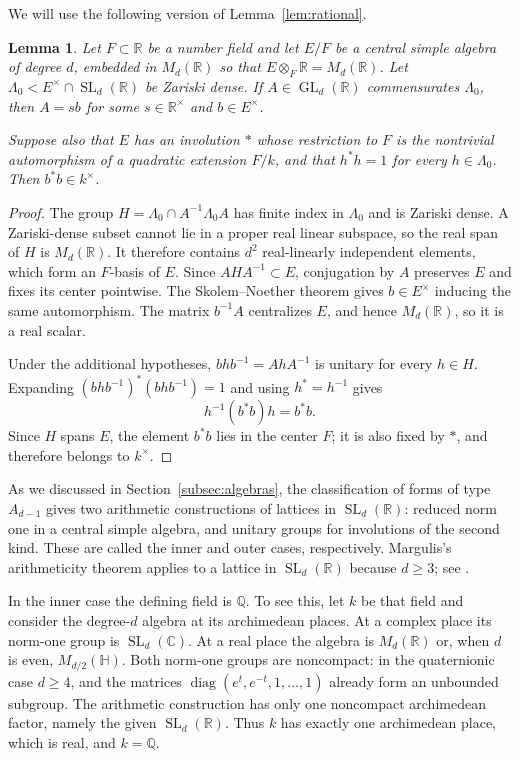 \documentclass[reqno]{amsart}
\newtheorem{lemma}[theorem]{Lemma}
\theoremstyle{remark}
\DeclareMathOperator{\GL}{GL}
\DeclareMathOperator{\SL}{SL}
\newcommand{\R}{\mathbb R}
\newcommand{\C}{\mathbb C}
\newcommand{\Q}{\mathbb Q}
\begin{document}
We will use the following version of Lemma~\ref{lem:rational}.

\begin{lemma}\label{lem:csarational}
Let $F\subset\R$ be a number field and let $E/F$ be a central simple algebra of degree $d$, embedded in $M_d(\R)$ so that $E\otimes_F\R=M_d(\R)$. Let $\Lambda_0<E^\times\cap\SL_d(\R)$ be Zariski dense. If $A\in\GL_d(\R)$ commensurates $\Lambda_0$, then $A=sb$ for some $s\in\R^\times$ and $b\in E^\times$.

Suppose also that $E$ has an involution $*$ whose restriction to $F$ is the nontrivial automorphism of a quadratic extension $F/k$, and that $h^*h=1$ for every $h\in\Lambda_0$. Then $b^*b\in k^\times$.
\end{lemma}

\begin{proof}
The group $H=\Lambda_0\cap A^{-1}\Lambda_0A$ has finite index in $\Lambda_0$ and is Zariski dense. A Zariski-dense subset cannot lie in a proper real linear subspace, so the real span of $H$ is $M_d(\R)$. It therefore contains $d^2$ real-linearly independent elements, which form an $F$-basis of $E$. Since $AHA^{-1}\subset E$, conjugation by $A$ preserves $E$ and fixes its center pointwise. The Skolem--Noether theorem gives $b\in E^\times$ inducing the same automorphism. The matrix $b^{-1}A$ centralizes $E$, and hence $M_d(\R)$, so it is a real scalar.

Under the additional hypotheses, $bhb^{-1}=AhA^{-1}$ is unitary for every $h\in H$. Expanding $(bhb^{-1})^*(bhb^{-1})=1$ and using $h^*=h^{-1}$ gives
$$
h^{-1}(b^*b)h=b^*b.
$$
Since $H$ spans $E$, the element $b^*b$ lies in the center $F$; it is also fixed by $*$, and therefore belongs to $k^\times$.
\end{proof}

As we discussed in Section~\ref{subsec:algebras}, the classification of forms of type $A_{d-1}$ gives two arithmetic constructions of lattices in $\SL_d(\R)$: reduced norm one in a central simple algebra, and unitary groups for involutions of the second kind. These are called the inner and outer cases, respectively. Margulis's arithmeticity theorem applies to a lattice in $\SL_d(\R)$ because $d \ge 3$; see \cite[Theorem 5.2.1]{MorrisAG}.

In the inner case the defining field is $\Q$. To see this, let $k$ be that field and consider the degree-$d$ algebra at its archimedean places. At a complex place its norm-one group is $\SL_d(\C)$. At a real place the algebra is $M_d(\R)$ or, when $d$ is even, $M_{d/2}(\mathbb H)$. Both norm-one groups are noncompact: in the quaternionic case $d\ge4$, and the matrices $\operatorname{diag}(e^t,e^{-t},1,\ldots,1)$ already form an unbounded subgroup. The arithmetic construction has only one noncompact archimedean factor, namely the given $\SL_d(\R)$. Thus $k$ has exactly one archimedean place, which is real, and $k=\Q$.
\end{document}
